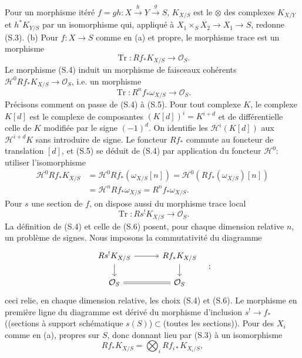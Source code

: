 \documentclass[11pt,leqno]{article}
\DeclareMathOperator{\Tr}{Tr}
\newcommand{\OO}{\mathcal O}
\begin{document}
Pour un morphisme itéré $f=gh:X\xrightarrow{h}Y\xrightarrow{g}S$, $K_{X/S}$ est le $\otimes$ des complexes $K_{X/Y}$ et $h^*K_{Y/S}$ par un isomorphisme qui, appliqué à $X_1\times_SX_2\to X_1\to S$, redonne (S.3).
\clearpage
\noindent (b) Pour $f:X\to S$ comme en (a) et propre, le morphisme trace est un morphisme
\begin{equation}
        \Tr:Rf_*K_{X/S}\longrightarrow\OO_S. \tag{S.4}
\end{equation}
Le morphisme (S.4) induit un morphisme de faisceaux cohérents $\mathcal H^0Rf_*K_{X/S}\to\OO_S$, i.e. un morphisme
\begin{equation}
        \Tr:R^nf_*\omega_{X/S}\longrightarrow\OO_S. \tag{S.5}
\end{equation}
Précisons comment on passe de (S.4) à (S.5). Pour tout complexe $K$, le complexe $K[d]$ est le complexe de composantes $(K[d])^i=K^{i+d}$ et de différentielle celle de $K$ modifiée par le signe $(-1)^d$. On identifie les $\mathcal H^i(K[d])$ aux $\mathcal H^{i+d}K$ sans introduire de signe. Le foncteur $Rf_*$ commute au foncteur de translation $[d]$, et (S.5) se déduit de (S.4) par application du foncteur $\mathcal H^0$: utiliser l'isomorphisme
\[
\begin{aligned}
\mathcal H^0Rf_*K_{X/S}
&=\mathcal H^0Rf_*(\omega_{X/S}[n])
 =\mathcal H^0(Rf_*(\omega_{X/S})[n])\\
&=\mathcal H^nRf_*\omega_{X/S}=R^nf_*\omega_{X/S}.
\end{aligned}
\]
Pour $s$ une section de $f$, on dispose aussi du morphisme trace local
\begin{equation}
        \Tr:Rs^!K_{X/S}\longrightarrow\OO_S. \tag{S.6}
\end{equation}
La définition de (S.4) et celle de (S.6) posent, pour chaque dimension relative $n$, un problème de signes. Nous imposons la commutativité du diagramme
\[
\begin{tikzcd}[column sep=3em,row sep=1.5em]
Rs^!K_{X/S} \arrow[r] \arrow[d] & Rf_*K_{X/S} \arrow[d] \\
\OO_S \arrow[r,equal] & \OO_S
\end{tikzcd}
\quad;
\]
ceci relie, en chaque dimension relative, les choix (S.4) et (S.6). Le morphisme en première ligne du diagramme est dérivé du morphisme d'inclusion $s^!\to f_*$ ((sections à support schématique $s(S)$)$\subset$(toutes les sections)). Pour des $X_i$ comme en (a), propres sur $S$, donc donnant lieu par (S.3) à un isomorphisme
\[
        Rf_*K_{X/S}=\bigotimes_i Rf_{i*}K_{X_i/S},
\]
\end{document}
